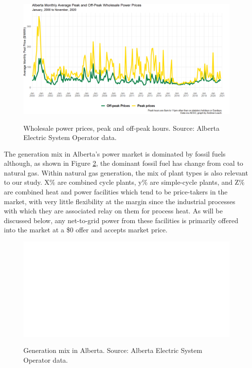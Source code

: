 \documentclass[12pt]{article}
\begin{document}
\begin{figure}[!h]%
	\centering \vspace{-.25cm} \includegraphics[width=6.5in]{../images/peak_prices_2000_2020.png}
\label{fig:masnadi_1}
\vspace{-0.75cm}	\caption{Wholesale power prices, peak and off-peak hours.  Source: Alberta Electric System Operator data.}
\end{figure}



The generation mix in Alberta's power market is dominated by fossil fuels although, as shown in Figure \ref{fig:gen_mix}, the dominant fossil fuel has change from coal to natural gas. Within natural gas generation, the mix of plant types is also relevant to our study. X\% are combined cycle plants, y\% are simple-cycle plants, and Z\% are combined heat and power facilities which tend to be price-takers in the market, with very little flexibility at the margin since the industrial processes with which they are associated relay on them for process heat. As will be discussed below, any net-to-grid power from these facilities is primarily offered into the market at a \$0 offer and accepts market price.

\begin{figure}[!h]%
	\centering \vspace{-.25cm} \includegraphics[width=6.5in]{../images/gen_fuel.png}
\label{fig:gen_mix}
\vspace{-0.75cm}	\caption{Generation mix in Alberta.  Source: Alberta Electric System Operator data.}
\end{figure}
\end{document}

